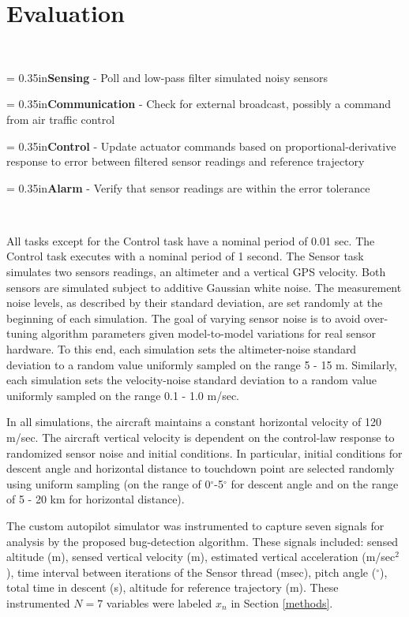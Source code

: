 \section{Evaluation} \label{evaluation_1}

\par{~}

\hangindent = 0.35in\textbf{Sensing} - Poll and low-pass filter simulated noisy sensors

\hangindent = 0.35in\textbf{Communication} - Check for external broadcast, possibly a command from air traffic control

\hangindent = 0.35in\textbf{Control} - Update actuator commands based on proportional-derivative response to error between filtered sensor readings and reference trajectory

\hangindent = 0.35in\textbf{Alarm} - Verify that sensor readings are within the error tolerance

\par{~}

All tasks except for the Control task have a nominal period of 0.01
sec. The Control task executes with a nominal period of 1 second. The
Sensor task simulates two sensors readings, an altimeter and a
vertical GPS velocity. Both sensors are simulated subject to additive
Gaussian white noise. The measurement noise levels, as described by
their standard deviation, are set randomly at the beginning of each
simulation. The goal of varying sensor noise is to avoid over-tuning
algorithm parameters given model-to-model variations for real sensor
hardware. To this end, each simulation sets the altimeter-noise
standard deviation to a random value uniformly sampled on the range 5
- 15 m. Similarly, each simulation sets the velocity-noise standard
deviation to a random value uniformly sampled on the range 0.1 - 1.0 m/sec.

In all simulations, the aircraft maintains a constant horizontal
velocity of 120 m/sec. The aircraft vertical velocity is dependent on
the control-law response to randomized sensor noise and initial
conditions.  In particular, initial conditions for descent angle and
horizontal distance to touchdown point are selected randomly using
uniform sampling (on the range of 0$^\circ$-5$^\circ$ for descent
angle and on the range of 5 - 20 km for horizontal distance).

The custom autopilot simulator was instrumented to capture seven
signals for analysis by the proposed bug-detection algorithm.  These
signals included:  sensed altitude (m), sensed vertical velocity (m),
estimated vertical acceleration (m/sec$^2$), time interval between
iterations of the Sensor thread (msec), pitch angle ($^\circ$), total
time in descent (s), altitude for reference trajectory (m). These
instrumented $N=7$ variables were labeled $x_n$ in Section \ref{methods}.

